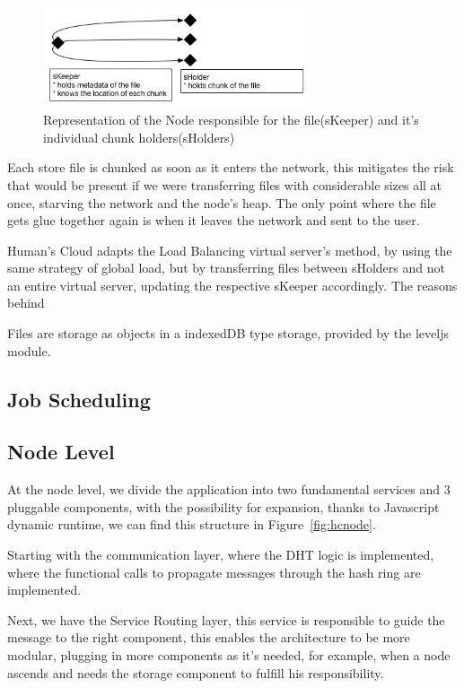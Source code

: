 \documentclass{./llncs2e/llncs}
\begin{document}
\begin{figure}[h!]
  \centering
  \includegraphics[width=0.7\textwidth]{img/skeepersholder.jpg}
  \caption{Representation of the Node responsible for the file(sKeeper) and it's individual chunk holders(sHolders)}
  \label{fig:skeepersholder}
\end{figure}

Each store file is chunked as soon as it enters the network, this mitigates the risk that would be present if we were transferring files with considerable sizes all at once, starving the network and the node's heap. The only point where the file gets glue together again is when it leaves the network and sent to the user.

Human's Cloud adapts the Load Balancing virtual server's method, by using the same strategy of global load, but by transferring files between sHolders and not an entire virtual server, updating the respective sKeeper accordingly. The reasons behind

Files are storage as objects in a indexedDB type storage, provided by the leveljs module. 

\subsection{Job Scheduling}

\subsection{Node Level}

At the node level, we divide the application into two fundamental services and 3 pluggable components, with the possibility for expansion, thanks to Javascript dynamic runtime, we can find this structure in Figure~\ref{fig:hcnode}.

Starting with the communication layer, where the DHT logic is implemented, where the functional calls to propagate messages through the hash ring are implemented. 

Next, we have the Service Routing layer, this service is responsible to guide the message to the right component, this enables the architecture to be more modular, plugging in more components as it's needed, for example, when a node ascends and needs the storage component to fulfill his responsibility.
\end{document}
